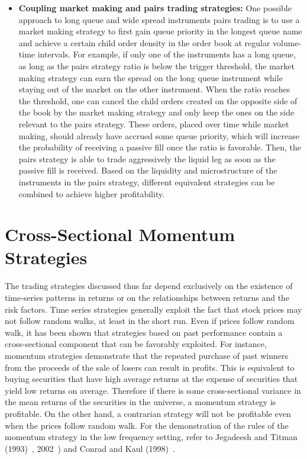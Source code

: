 \begin{itemize}
\item \textbf{Coupling market making and pairs trading strategies:} One possible approach to long queue and wide spread instruments pairs trading is to use a market making strategy to first gain queue priority in the longest queue name and achieve a certain child order density in the order book at regular volume-time intervals. For example, if only one of the instruments has a long queue, as long as the pairs strategy ratio is below the trigger threshold, the market making strategy can earn the spread on the long queue instrument while staying out of the market on the other instrument. When the ratio reaches the threshold, one can cancel the child orders created on the opposite side of the book by the market making strategy and only keep the ones on the side relevant to the pairs strategy. These orders, placed over time while market making, should already have accrued some queue priority, which will increase the probability of receiving a passive fill once the ratio is favorable. Then, the pairs strategy is able to trade aggressively the liquid leg as soon as the passive fill is received. Based on the liquidity and microstructure of the instruments in the pairs strategy, different equivalent strategies can be combined to achieve higher profitability.
\end{itemize}



\section{Cross-Sectional Momentum Strategies}

The trading strategies discussed thus far depend exclusively on the existence of time-series patterns in returns or on the relationships between returns and the risk factors. Time series strategies generally exploit the fact that stock prices may not follow random walks, at least in the short run. Even if prices follow random walk, it has been shown that strategies based on past performance contain a cross-sectional component that can be favorably exploited. For instance, momentum strategies demonstrate that the repeated purchase of past winners from the proceeds of the sale of losers can result in profits. This is equivalent to buying securities that have high average returns at the expense of securities that yield low returns on average. Therefore if there is some cross-sectional variance in the mean returns of the securities in the universe, a momentum strategy is profitable. On the other hand, a contrarian strategy will not be profitable even when the prices follow random walk. For the demonstration of the rules of the momentum strategy in the low frequency setting, refer to Jegadeesh and Titman (1993)~\cite{JeTit1993}, 2002~\cite{JeTit}) and Conrad and Kaul (1998)~\cite{conrad1998}.


